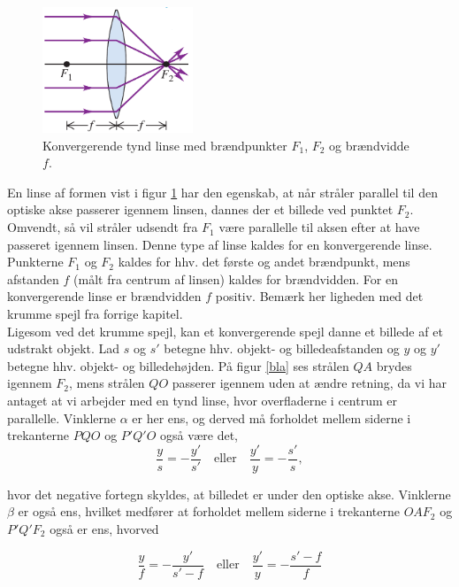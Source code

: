 \begin{figure}
	\centering
	\includegraphics[width=4.5cm]{Geometrisk-Optik/conv_lens.PNG}
	\caption{Konvergerende tynd linse med brændpunkter $F_1$, $F_2$ og brændvidde $f$. } \label{fig:konv}
\end{figure}

\noindent En linse af formen vist i figur \ref{fig:konv} har den egenskab, at når stråler parallel til den optiske akse passerer igennem linsen, dannes der et billede ved punktet $F_2$. Omvendt, så vil stråler udsendt fra $F_1$ være parallelle til aksen efter at have passeret igennem linsen. Denne type af linse kaldes for en konvergerende linse. Punkterne $F_1$ og $F_2$ kaldes for hhv. det første og andet brændpunkt, mens afstanden $f$ (målt fra centrum af linsen) kaldes for brændvidden. For en konvergerende linse er brændvidden $f$ positiv. Bemærk her ligheden med det krumme spejl fra forrige kapitel. \\ 

\noindent Ligesom ved det krumme spejl, kan et konvergerende spejl danne et billede af et udstrakt objekt. Lad $s$ og $s'$ betegne hhv. objekt- og billedeafstanden og $y$ og $y'$ betegne hhv. objekt- og billedehøjden. På figur \ref{bla} ses strålen $QA$ brydes igennem $F_2$, mens strålen $QO$ passerer igennem uden at ændre retning, da vi har antaget at vi arbejder med en tynd linse, hvor overfladerne i centrum er parallelle. Vinklerne $\alpha$ er her ens, og derved må forholdet mellem siderne i trekanterne $PQO$ og $P'Q'O$ også være det,
\begin{equation}
\frac{y}{s} = -\frac{y'}{s'} \quad \text{eller} \quad \frac{y'}{y} = -\frac{s'}{s},
\label{eq:1}
\end{equation}

\noindent hvor det negative fortegn skyldes, at billedet er under den optiske akse. Vinklerne $\beta$ er også ens, hvilket medfører at forholdet mellem siderne i trekanterne $OAF_2$ og $P'Q'F_2$ også er ens, hvorved

\begin{equation}
\frac{y}{f}=-\frac{y'}{s'-f} \quad \text{eller} \quad \frac{y'}{y} = -\frac{s'-f}{f}
\label{eq:2}
\end{equation}

